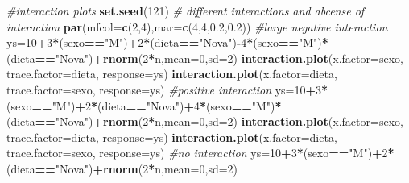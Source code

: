\documentclass[
]{book}
\newenvironment{Shaded}{\begin{snugshade}}{\end{snugshade}}
\newcommand{\CommentTok}[1]{\textcolor[rgb]{0.56,0.35,0.01}{\textit{#1}}}
\newcommand{\DataTypeTok}[1]{\textcolor[rgb]{0.13,0.29,0.53}{#1}}
\newcommand{\DecValTok}[1]{\textcolor[rgb]{0.00,0.00,0.81}{#1}}
\newcommand{\FloatTok}[1]{\textcolor[rgb]{0.00,0.00,0.81}{#1}}
\newcommand{\KeywordTok}[1]{\textcolor[rgb]{0.13,0.29,0.53}{\textbf{#1}}}
\newcommand{\NormalTok}[1]{#1}
\newcommand{\OperatorTok}[1]{\textcolor[rgb]{0.81,0.36,0.00}{\textbf{#1}}}
\newcommand{\StringTok}[1]{\textcolor[rgb]{0.31,0.60,0.02}{#1}}
\begin{document}
\begin{Shaded}
\begin{Highlighting}[]
\CommentTok{#interaction plots}
\KeywordTok{set.seed}\NormalTok{(}\DecValTok{121}\NormalTok{)}
\CommentTok{# different interactions and abcense of interaction}
\KeywordTok{par}\NormalTok{(}\DataTypeTok{mfcol=}\KeywordTok{c}\NormalTok{(}\DecValTok{2}\NormalTok{,}\DecValTok{4}\NormalTok{),}\DataTypeTok{mar=}\KeywordTok{c}\NormalTok{(}\DecValTok{4}\NormalTok{,}\DecValTok{4}\NormalTok{,}\FloatTok{0.2}\NormalTok{,}\FloatTok{0.2}\NormalTok{))}
\CommentTok{#large negative interaction}
\NormalTok{ys=}\DecValTok{10}\OperatorTok{+}\DecValTok{3}\OperatorTok{*}\NormalTok{(sexo}\OperatorTok{==}\StringTok{"M"}\NormalTok{)}\OperatorTok{+}\DecValTok{2}\OperatorTok{*}\NormalTok{(dieta}\OperatorTok{==}\StringTok{"Nova"}\NormalTok{)}\OperatorTok{-}\DecValTok{4}\OperatorTok{*}\NormalTok{(sexo}\OperatorTok{==}\StringTok{"M"}\NormalTok{)}\OperatorTok{*}\NormalTok{(dieta}\OperatorTok{==}\StringTok{"Nova"}\NormalTok{)}\OperatorTok{+}\KeywordTok{rnorm}\NormalTok{(}\DecValTok{2}\OperatorTok{*}\NormalTok{n,}\DataTypeTok{mean=}\DecValTok{0}\NormalTok{,}\DataTypeTok{sd=}\DecValTok{2}\NormalTok{)}
\KeywordTok{interaction.plot}\NormalTok{(}\DataTypeTok{x.factor=}\NormalTok{sexo, }\DataTypeTok{trace.factor=}\NormalTok{dieta, }\DataTypeTok{response=}\NormalTok{ys)}
\KeywordTok{interaction.plot}\NormalTok{(}\DataTypeTok{x.factor=}\NormalTok{dieta, }\DataTypeTok{trace.factor=}\NormalTok{sexo, }\DataTypeTok{response=}\NormalTok{ys)}
\CommentTok{#positive interaction}
\NormalTok{ys=}\DecValTok{10}\OperatorTok{+}\DecValTok{3}\OperatorTok{*}\NormalTok{(sexo}\OperatorTok{==}\StringTok{"M"}\NormalTok{)}\OperatorTok{+}\DecValTok{2}\OperatorTok{*}\NormalTok{(dieta}\OperatorTok{==}\StringTok{"Nova"}\NormalTok{)}\OperatorTok{+}\DecValTok{4}\OperatorTok{*}\NormalTok{(sexo}\OperatorTok{==}\StringTok{"M"}\NormalTok{)}\OperatorTok{*}\NormalTok{(dieta}\OperatorTok{==}\StringTok{"Nova"}\NormalTok{)}\OperatorTok{+}\KeywordTok{rnorm}\NormalTok{(}\DecValTok{2}\OperatorTok{*}\NormalTok{n,}\DataTypeTok{mean=}\DecValTok{0}\NormalTok{,}\DataTypeTok{sd=}\DecValTok{2}\NormalTok{)}
\KeywordTok{interaction.plot}\NormalTok{(}\DataTypeTok{x.factor=}\NormalTok{sexo, }\DataTypeTok{trace.factor=}\NormalTok{dieta, }\DataTypeTok{response=}\NormalTok{ys)}
\KeywordTok{interaction.plot}\NormalTok{(}\DataTypeTok{x.factor=}\NormalTok{dieta, }\DataTypeTok{trace.factor=}\NormalTok{sexo, }\DataTypeTok{response=}\NormalTok{ys)}
\CommentTok{#no interaction}
\NormalTok{ys=}\DecValTok{10}\OperatorTok{+}\DecValTok{3}\OperatorTok{*}\NormalTok{(sexo}\OperatorTok{==}\StringTok{"M"}\NormalTok{)}\OperatorTok{+}\DecValTok{2}\OperatorTok{*}\NormalTok{(dieta}\OperatorTok{==}\StringTok{"Nova"}\NormalTok{)}\OperatorTok{+}\KeywordTok{rnorm}\NormalTok{(}\DecValTok{2}\OperatorTok{*}\NormalTok{n,}\DataTypeTok{mean=}\DecValTok{0}\NormalTok{,}\DataTypeTok{sd=}\DecValTok{2}\NormalTok{)}

\end{Highlighting}
\end{Shaded}
\end{document}
